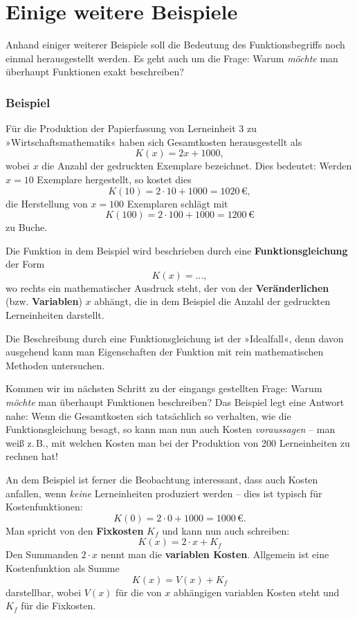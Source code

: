 \section{Einige weitere Beispiele}

Anhand einiger weiterer Beispiele soll die Bedeutung des Funktionsbegriffs noch einmal herausgestellt werden. Es geht auch um die Frage: Warum \emph{möchte} man überhaupt Funktionen exakt beschreiben?


\subsubsection{Beispiel}

Für die Produktion der Papierfassung von Lerneinheit 3 zu »Wirtschaftsmathematik« haben sich Gesamtkosten herausgestellt als
\[ K(x) = 2x + 1000 , \]
wobei $x$ die Anzahl der gedruckten Exemplare bezeichnet. Dies bedeutet: Werden $x = 10$ Exemplare hergestellt, so kostet dies
\[ K(10) = 2 \cdot 10 + 1000 = 1020\,€ , \]
die Herstellung von $x = 100$ Exemplaren schlägt mit
\[ K(100) = 2 \cdot 100 + 1000 = 1200\,€ \]
zu Buche.\beispielende

Die Funktion in dem Beispiel wird beschrieben durch eine \textbf{Funktionsgleichung} der Form
\[ K(x) = \ldots , \]
wo rechts ein mathematischer Ausdruck steht, der von der \textbf{Veränderlichen} (bzw. \textbf{Variablen}) $x$ abhängt, die in dem Beispiel die Anzahl der gedruckten Lerneinheiten darstellt.

Die Beschreibung durch eine Funktionsgleichung ist der »Idealfall«, denn davon ausgehend kann man Eigenschaften der Funktion mit rein mathematischen Methoden untersuchen.

Kommen wir im nächsten Schritt zu der eingangs gestellten Frage: Warum \emph{möchte} man überhaupt Funktionen beschreiben? Das Beispiel legt eine Antwort nahe: Wenn die Gesamtkosten sich tatsächlich so verhalten, wie die Funktionsgleichung besagt, so kann man nun auch Kosten \emph{voraussagen} -- man weiß z.\,B., mit welchen Kosten man bei der Produktion von 200 Lerneinheiten zu rechnen hat!

An dem Beispiel ist ferner die Beobachtung interessant, dass auch Kosten anfallen, wenn \emph{keine} Lerneinheiten produziert werden -- dies ist typisch für Kostenfunktionen:
\[ K(0) = 2 \cdot 0 + 1000 = 1000\,€ . \]
Man spricht von den \textbf{Fixkosten} $K_f$ und kann nun auch schreiben:
\[ K(x) = 2 \cdot x + K_f \]
Den Summanden $2 \cdot x$ nennt man die \textbf{variablen Kosten}. Allgemein ist eine Kostenfunktion als Summe
\[ K(x) = V(x) + K_f \]
darstellbar, wobei $V(x)$ für die von $x$ abhängigen variablen Kosten steht und $K_f$ für die Fixkosten.

